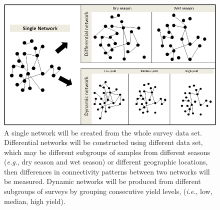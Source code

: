 \newpage
\begin{landscape}
\begin{figure}
\centering
\includegraphics[width=8in]{wholenet}
\caption[Network comparison]{A single network will be created from the whole survey data set. Differential networks will be constructed using different data set, which may be different subgroups of samples from different seasons (\textit{e.g.}, dry season and wet season) or different geographic locations, then differences in connectivity patterns between two networks will be measured. Dynamic networks will be produced from different subgroups of surveys by grouping consecutive yield levels, (\textit{i.e.}, low, median, high yield).}
\end{figure}
\end{landscape}

